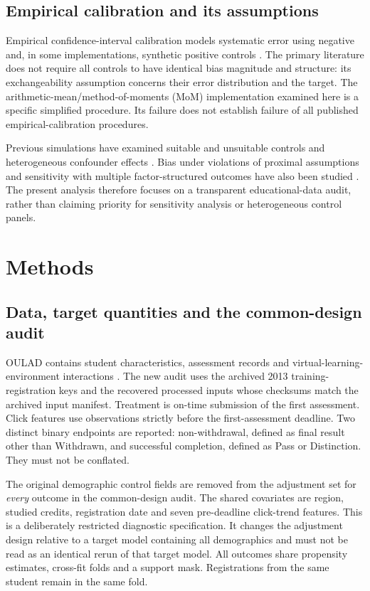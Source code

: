 \subsection{Empirical calibration and its assumptions}

Empirical confidence-interval calibration models systematic error using negative and, in some implementations, synthetic positive controls \cite{schuemie2018}. The primary literature does not require all controls to have identical bias magnitude and structure: its exchangeability assumption concerns their error distribution and the target. The arithmetic-mean/method-of-moments (MoM) implementation examined here is a specific simplified procedure. Its failure does not establish failure of all published empirical-calibration procedures.

Previous simulations have examined suitable and unsuitable controls and heterogeneous confounder effects \cite{hwang2022}. Bias under violations of proximal assumptions and sensitivity with multiple factor-structured outcomes have also been studied \cite{cobzaru2024,zheng2024}. The present analysis therefore focuses on a transparent educational-data audit, rather than claiming priority for sensitivity analysis or heterogeneous control panels.

\section{Methods}

\subsection{Data, target quantities and the common-design audit}

OULAD contains student characteristics, assessment records and virtual-learning-environment interactions \cite{kuzilek2017}. The new audit uses the archived 2013 training-registration keys and the recovered processed inputs whose checksums match the archived input manifest. Treatment is on-time submission of the first assessment. Click features use observations strictly before the first-assessment deadline. Two distinct binary endpoints are reported: non-withdrawal, defined as final result other than Withdrawn, and successful completion, defined as Pass or Distinction. They must not be conflated.

The original demographic control fields are removed from the adjustment set for \emph{every} outcome in the common-design audit. The shared covariates are region, studied credits, registration date and seven pre-deadline click-trend features. This is a deliberately restricted diagnostic specification. It changes the adjustment design relative to a target model containing all demographics and must not be read as an identical rerun of that target model. All outcomes share propensity estimates, cross-fit folds and a support mask. Registrations from the same student remain in the same fold.

